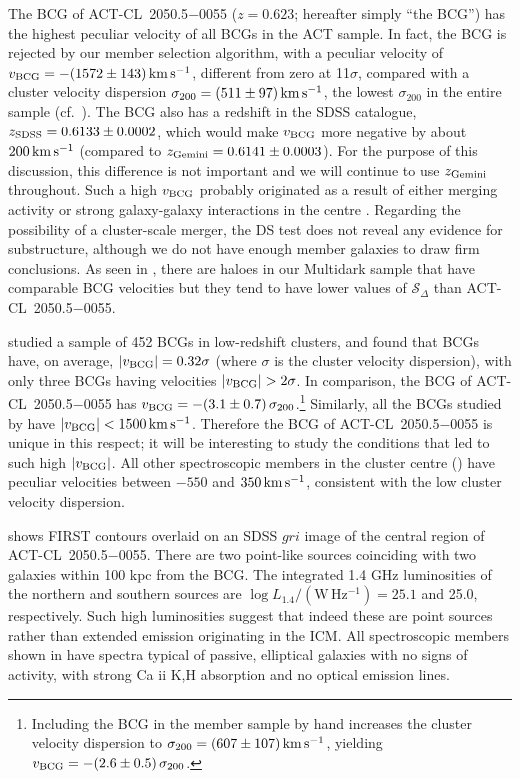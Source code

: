 The BCG of ACT-CL~2050.5$-$0055 ($z=0.623$; hereafter simply ``the BCG'') has the highest peculiar velocity of all BCGs in the ACT sample. In fact, the BCG is rejected by our member selection algorithm, with a peculiar velocity of $v_{\rm BCG}=-(1572\pm143)\,\mathrm{km\,s^{-1}}$, different from zero at 11$\sigma$, compared with a cluster velocity dispersion $\sigma_{200}=(511\pm97)\,\mathrm{km\,s^{-1}}$, the lowest $\sigma_{200}$ in the entire sample (cf.\ ). The BCG also has a redshift in the SDSS catalogue, $z_{\rm SDSS}=0.6133\pm0.0002$, which would make $v_{\rm BCG}$ more negative by about $200\,\mathrm{km\,s^{-1}}$ (compared to $z_{\rm Gemini}=0.6141\pm0.0003$). For the purpose of this discussion, this difference is not important and we will continue to use $z_{\rm Gemini}$ throughout. Such a high $v_{\rm BCG}$ probably originated as a result of either merging activity or strong galaxy-galaxy interactions in the centre \citep{martel14}. Regarding the possibility of a cluster-scale merger, the DS test does not reveal any evidence for substructure, although we do not have enough member galaxies to draw firm conclusions. As seen in , there are haloes in our Multidark sample that have comparable BCG velocities but they tend to have lower values of $\mathcal{S}_\Delta$ than ACT-CL~2050.5$-$0055. 

\cite{coziol09} studied a sample of 452 BCGs in low-redshift clusters, and found that BCGs have, 
on average, $\lvert v_{\rm BCG}\rvert=0.32\sigma$ (where $\sigma$ is the cluster velocity dispersion), with only 
three BCGs having velocities $\lvert v_{\rm BCG}\rvert>2\sigma$. In comparison, the BCG of ACT-CL~2050.5$-$0055 
has $v_{\rm BCG}=-(3.1\pm0.7)\,\sigma_{200}$.\footnote{Including the BCG in the member sample by hand 
increases the cluster velocity dispersion to $\sigma_{200}=(607\pm107)\,\mathrm{km\,s^{-1}}$, 
yielding $v_{\rm BCG}=-(2.6\pm0.5)\,\sigma_{200}$.} Similarly, all the BCGs studied by \cite{coziol09} 
have $\lvert v_{\rm BCG}\rvert<1500\,\mathrm{km\,s^{-1}}$. Therefore the BCG of ACT-CL~2050.5$-$0055 is unique in 
this respect; it will be interesting to study the conditions that led to such high $\lvert v_{\rm BCG}\rvert$. All 
other spectroscopic members in the cluster centre () have peculiar velocities 
between $-550$ and $350\,\mathrm{km\,s^{-1}}$, consistent with the low cluster velocity dispersion.

 shows FIRST contours overlaid on an SDSS $gri$ image of the central region of 
ACT-CL~2050.5$-$0055. There are two point-like sources coinciding with two galaxies within 100 kpc 
from the BCG. The integrated 1.4 GHz luminosities of the northern and southern sources are $\log 
L_{1.4}/(\mathrm{W\,Hz^{-1}})=25.1$ and 25.0, respectively. Such high luminosities suggest that 
indeed these are point sources rather than extended emission originating in the ICM. All 
spectroscopic members shown in  have spectra typical of passive, elliptical galaxies 
with no signs of activity, with strong Ca {\sc ii} K,H absorption and no optical emission lines.

